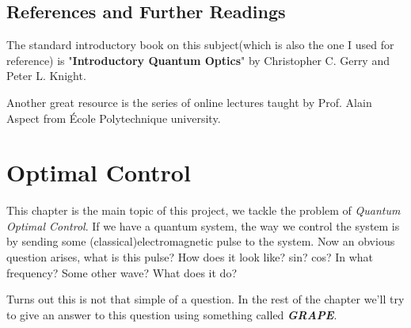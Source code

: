 \documentclass[english, a4paper, 12pt, twoside]{article}
\numberwithin{equation}{section} %
\begin{document}
\subsection{References and Further Readings}
The standard introductory book on this subject(which is also the one I used for reference) is "\textbf{Introductory Quantum Optics}" by Christopher C. Gerry and Peter L. Knight.

Another great resource is the series of online lectures taught by Prof. Alain Aspect from École Polytechnique university.

\newpage
\section{Optimal Control}\label{chap:optimal}
This chapter is the main topic of this project, we tackle the problem of \textit{Quantum Optimal Control}. If we have a quantum system, the way we control the system is by sending some (classical)electromagnetic pulse to the system. Now an obvious question arises, what is this pulse? How does it look like? sin? cos? In what frequency? Some other wave? What does it do?

Turns out this is not that simple of a question. In the rest of the chapter we'll try to give an answer to this question using something called \textbf{\textit{GRAPE}}.
\end{document}
